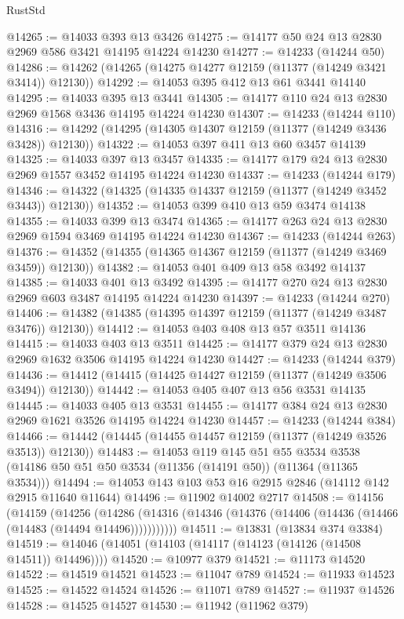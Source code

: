 \begin{lexlean}{RustStd}
\begin{coremodule}
@14265 := @14033 @393 @13 @3426
@14275 := @14177 @50 @24 @13 @2830 @2969 @586 @3421 @14195 @14224 @14230
@14277 := @14233 (@14244 @50)
@14286 := @14262 (@14265 (@14275 @14277 @12159 (@11377 (@14249 @3421 @3414)) @12130))
@14292 := @14053 @395 @412 @13 @61 @3441 @14140
@14295 := @14033 @395 @13 @3441
@14305 := @14177 @110 @24 @13 @2830 @2969 @1568 @3436 @14195 @14224 @14230
@14307 := @14233 (@14244 @110)
@14316 := @14292 (@14295 (@14305 @14307 @12159 (@11377 (@14249 @3436 @3428)) @12130))
@14322 := @14053 @397 @411 @13 @60 @3457 @14139
@14325 := @14033 @397 @13 @3457
@14335 := @14177 @179 @24 @13 @2830 @2969 @1557 @3452 @14195 @14224 @14230
@14337 := @14233 (@14244 @179)
@14346 := @14322 (@14325 (@14335 @14337 @12159 (@11377 (@14249 @3452 @3443)) @12130))
@14352 := @14053 @399 @410 @13 @59 @3474 @14138
@14355 := @14033 @399 @13 @3474
@14365 := @14177 @263 @24 @13 @2830 @2969 @1594 @3469 @14195 @14224 @14230
@14367 := @14233 (@14244 @263)
@14376 := @14352 (@14355 (@14365 @14367 @12159 (@11377 (@14249 @3469 @3459)) @12130))
@14382 := @14053 @401 @409 @13 @58 @3492 @14137
@14385 := @14033 @401 @13 @3492
@14395 := @14177 @270 @24 @13 @2830 @2969 @603 @3487 @14195 @14224 @14230
@14397 := @14233 (@14244 @270)
@14406 := @14382 (@14385 (@14395 @14397 @12159 (@11377 (@14249 @3487 @3476)) @12130))
@14412 := @14053 @403 @408 @13 @57 @3511 @14136
@14415 := @14033 @403 @13 @3511
@14425 := @14177 @379 @24 @13 @2830 @2969 @1632 @3506 @14195 @14224 @14230
@14427 := @14233 (@14244 @379)
@14436 := @14412 (@14415 (@14425 @14427 @12159 (@11377 (@14249 @3506 @3494)) @12130))
@14442 := @14053 @405 @407 @13 @56 @3531 @14135
@14445 := @14033 @405 @13 @3531
@14455 := @14177 @384 @24 @13 @2830 @2969 @1621 @3526 @14195 @14224 @14230
@14457 := @14233 (@14244 @384)
@14466 := @14442 (@14445 (@14455 @14457 @12159 (@11377 (@14249 @3526 @3513)) @12130))
@14483 := @14053
    @119
    @145
    @51
    @55
    @3534
    @3538
    (@14186 @50 @51 @50 @3534 (@11356 (@14191 @50)) (@11364 (@11365 @3534)))
@14494 := @14053 @143 @103 @53 @16 @2915 @2846 (@14112 @142 @2915 @11640 @11644)
@14496 := @11902 @14002 @2717
@14508 := @14156
    (@14159
      (@14256
        (@14286 (@14316 (@14346 (@14376 (@14406 (@14436 (@14466 (@14483 (@14494 @14496)))))))))))
@14511 := @13831 (@13834 @374 @3384)
@14519 := @14046 (@14051 (@14103 (@14117 (@14123 (@14126 (@14508 @14511)) @14496))))
@14520 := @10977 @379
@14521 := @11173 @14520
@14522 := @14519 @14521
@14523 := @11047 @789
@14524 := @11933 @14523
@14525 := @14522 @14524
@14526 := @11071 @789
@14527 := @11937 @14526
@14528 := @14525 @14527
@14530 := @11942 (@11962 @379)

\end{coremodule}
\end{lexlean}
